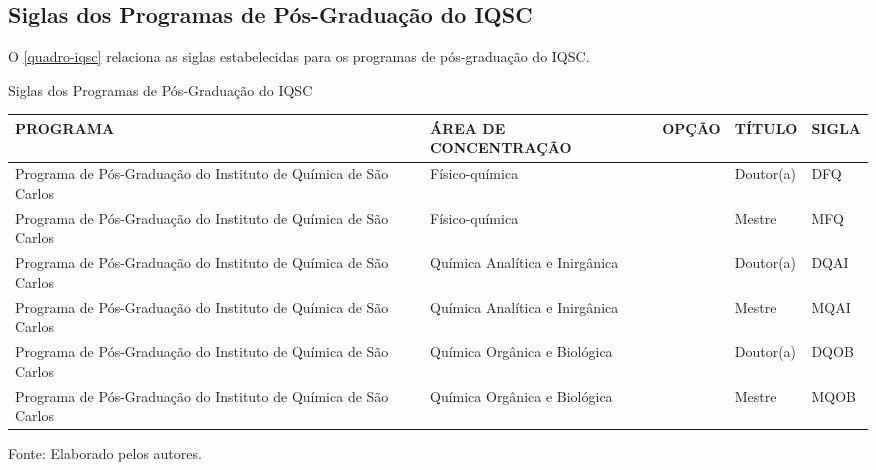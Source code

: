 \begin{apendicesenv}
\chapter{Siglas dos Programas de Pós-Graduação do IQSC}
O \autoref{quadro-iqsc} relaciona as siglas estabelecidas para os programas de pós-graduação do IQSC.
\begin{quadro}[htb]
\ABNTEXfontereduzida
\caption[Siglas dos Programas de Pós-Graduação do IQSC]{Siglas dos Programas de Pós-Graduação do IQSC}
\label{quadro-iqsc}
\begin{tabular}{|p{3.5cm}|p{3.5cm}|p{3.5cm}|p{1.5cm}|p{2.25cm}|}
  \hline
   \textbf{PROGRAMA} & \textbf{ÁREA DE CONCENTRAÇÃO} & \textbf{OPÇÃO} & \textbf{TÍTULO} & \textbf{SIGLA}  \\
    \hline
Programa de Pós-Graduação do Instituto de Química de São Carlos & Físico-química &  & Doutor(a) & DFQ\\
Programa de Pós-Graduação do Instituto de Química de São Carlos & Físico-química &  & Mestre & MFQ\\
Programa de Pós-Graduação do Instituto de Química de São Carlos & Química Analítica e Inirg\^anica &  & Doutor(a) & DQAI\\
Programa de Pós-Graduação do Instituto de Química de São Carlos & Química Analítica e Inirg\^anica &  & Mestre & MQAI\\
Programa de Pós-Graduação do Instituto de Química de São Carlos & Química Org\^anica e Biológica &  & Doutor(a) & DQOB\\
Programa de Pós-Graduação do Instituto de Química de São Carlos & Química Org\^anica e Biológica &  & Mestre & MQOB\\
\hline

\end{tabular}
\begin{flushleft}
		Fonte: Elaborado pelos autores.\
\end{flushleft}
\end{quadro}


\end{apendicesenv}
